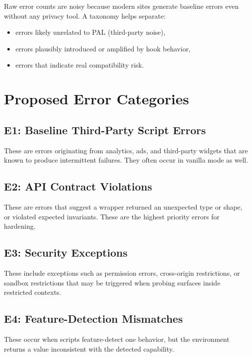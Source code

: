 \documentclass[11pt]{report}
\begin{document}
Raw error counts are noisy because modern sites generate baseline errors even without any privacy tool. A taxonomy helps separate:

\begin{itemize}
    \item errors likely unrelated to PAL (third-party noise),
    \item errors plausibly introduced or amplified by hook behavior,
    \item errors that indicate real compatibility risk.
\end{itemize}

\section{Proposed Error Categories}

\subsection{E1: Baseline Third-Party Script Errors}

These are errors originating from analytics, ads, and third-party widgets that are known to produce intermittent failures. They often occur in vanilla mode as well.

\subsection{E2: API Contract Violations}

These are errors that suggest a wrapper returned an unexpected type or shape, or violated expected invariants. These are the highest priority errors for hardening.

\subsection{E3: Security Exceptions}

These include exceptions such as permission errors, cross-origin restrictions, or sandbox restrictions that may be triggered when probing surfaces inside restricted contexts.

\subsection{E4: Feature-Detection Mismatches}

These occur when scripts feature-detect one behavior, but the environment returns a value inconsistent with the detected capability.
\end{document}
